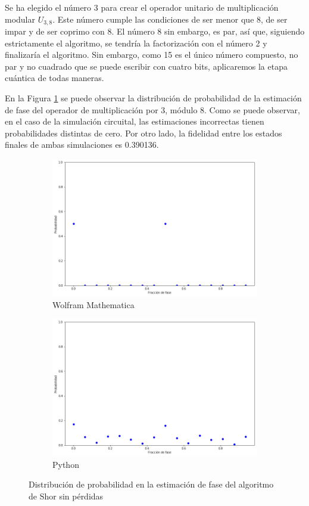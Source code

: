 Se ha elegido el número 3 para crear el operador unitario de multiplicación modular $U_{3,8}$. Este número cumple las condiciones de ser menor que 8, de ser impar y de ser coprimo con 8. El número 8 sin embargo, es par, así que, siguiendo estrictamente el algoritmo, se tendría la factorización con el número 2 y finalizaría el algoritmo. Sin embargo, como 15 es el único número compuesto, no par y no cuadrado que se puede escribir con cuatro bits, aplicaremos la etapa cuántica de todas maneras.

En la Figura \ref{fig:shor8} se puede observar la distribución de probabilidad de la estimación de fase del operador de multiplicación por 3, módulo 8. Como se puede observar, en el caso de la simulación circuital, las estimaciones incorrectas tienen probabilidades distintas de cero. Por otro lado, la fidelidad entre los estados finales de ambas simulaciones es 0.390136.

\begin{figure}[H]
    \centering
    \begin{subfigure}[m]{0.45\textwidth}
        \centering
        \includegraphics[width=0.9\linewidth]{img/ShorM8.png}
        \caption{Wolfram Mathematica}
    \end{subfigure}
    \begin{subfigure}[m]{0.45\textwidth}
        \centering
        \includegraphics[width=0.9\linewidth]{img/shor2lossless.png}
        \caption{Python}
    \end{subfigure}
    \caption[Distribución de probabilidad en la estimación de fase del algoritmo de Shor sin pérdidas]{Distribución de probabilidad en la estimación de fase del algoritmo de Shor sin pérdidas}
    \label{fig:shor8}
\end{figure}

